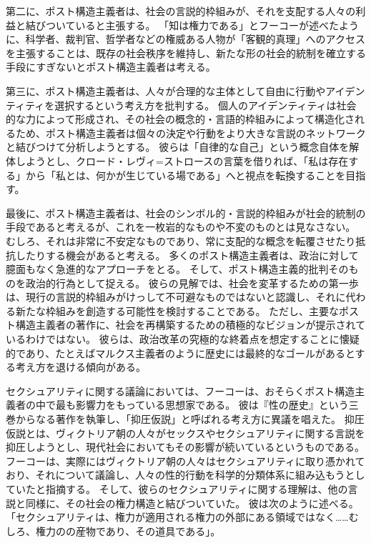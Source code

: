 \documentclass[paper=a4,book,openany]{jlreq}
\begin{document}
第二に、ポスト構造主義者は、社会の言説的枠組みが、それを支配する人々の利益と結びついていると主張する。
「知は権力である」とフーコーが述べたように、科学者、裁判官、哲学者などの権威ある人物が「客観的真理」へのアクセスを主張することは、既存の社会秩序を維持し、新たな形の社会的統制を確立する手段にすぎないとポスト構造主義者は考える。

第三に、ポスト構造主義者は、人々が合理的な主体として自由に行動やアイデンティティを選択するという考え方を批判する。
個人のアイデンティティは社会的な力によって形成され、その社会の概念的・言語的枠組みによって構造化されるため、ポスト構造主義者は個々の決定や行動をより大きな言説のネットワークと結びつけて分析しようとする。
彼らは「自律的な自己」という概念自体を解体しようとし、クロード・レヴィ=ストロースの言葉を借りれば、「私は存在する」から「私とは、何かが生じている場である」へと視点を転換することを目指す。

最後に、ポスト構造主義者は、社会のシンボル的・言説的枠組みが社会的統制の手段であると考えるが、これを一枚岩的なものや不変のものとは見なさない。
むしろ、それは非常に不安定なものであり、常に支配的な概念を転覆させたり抵抗したりする機会があると考える。
多くのポスト構造主義者は、政治に対して臆面もなく急進的なアプローチをとる。
そして、ポスト構造主義的批判そのものを政治的行為として捉える。
彼らの見解では、社会を変革するための第一歩は、現行の言説的枠組みがけっして不可避なものではないと認識し、それに代わる新たな枠組みを創造する可能性を検討することである。
ただし、主要なポスト構造主義者の著作に、社会を再構築するための積極的なビジョンが提示されているわけではない。
彼らは、政治改革の究極的な終着点を想定することに懐疑的であり、たとえばマルクス主義者のように歴史には最終的なゴールがあるとする考え方を退ける傾向がある。

セクシュアリティに関する議論においては、フーコーは、おそらくポスト構造主義者の中で最も影響力をもっている思想家である。
彼は『性の歴史』という三巻からなる著作を執筆し、「抑圧仮説」と呼ばれる考え方に異議を唱えた。
抑圧仮説とは、ヴィクトリア朝の人々がセックスやセクシュアリティに関する言説を抑圧しようとし、現代社会においてもその影響が続いているというものである。
フーコーは、実際にはヴィクトリア朝の人々はセクシュアリティに取り憑かれており、それについて議論し、人々の性的行動を科学的分類体系に組み込もうとしていたと指摘する。
そして、彼らのセクシュアリティに関する理解は、他の言説と同様に、その社会の権力構造と結びついていた。
彼は次のように述べる。
「セクシュアリティは、権力が適用される権力の外部にある領域ではなく……むしろ、権力のの産物であり、その道具である」\citep[p.152]{foucault81:_histor_sexual}。
\end{document}
